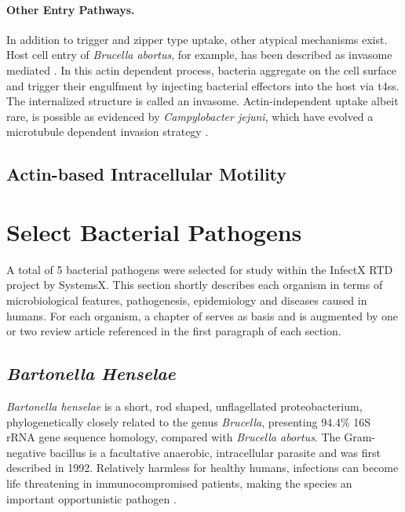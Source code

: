 \paragraph{Other Entry Pathways.}
In addition to trigger and zipper type uptake, other atypical mechanisms exist. Host cell entry of \textit{Brucella abortus}, for example, has been described as invasome mediated \citep{Dehio2005}. In this actin dependent process, bacteria aggregate on the cell surface and trigger their engulfment by injecting bacterial effectors into the host via \gls{t4ss}. The internalized structure is called an invasome. Actin-independent uptake albeit rare, is possible as evidenced by \textit{Campylobacter jejuni}, which have evolved a microtubule dependent invasion strategy \citep{Kopecko2001}.

\subsection{Actin-based Intracellular Motility}
\label{subsec:actin-motility}

\section{Select Bacterial Pathogens}

A total of 5 bacterial pathogens were selected for study within the InfectX RTD project by SystemsX. This section shortly describes each organism in terms of microbiological features, pathogenesis, epidemiology and diseases caused in humans. For each organism, a chapter of \cite{Rolain2006} serves as basis and is augmented by one or two review article referenced in the first paragraph of each section.

\subsection{\textit{Bartonella Henselae}}

\textit{Bartonella henselae} is a short, rod shaped, unflagellated proteobacterium, phylogenetically closely related to the genus \textit{Brucella}, presenting 94.4\% 16S rRNA gene sequence homology, compared with \textit{Brucella abortus}. The Gram-negative bacillus is a facultative anaerobic, intracellular parasite and was first described in 1992. Relatively harmless for healthy humans, infections can become life threatening in immunocompromised patients, making the species an important opportunistic pathogen \citep{Anderson1997}.

